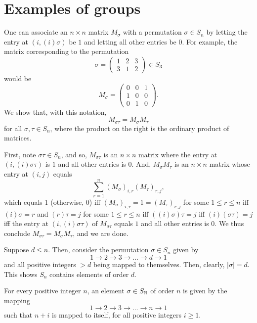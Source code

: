 \section{Examples of groups}
\begin{xca}
One can associate an $n \times n$ matrix $M_{\sigma}$ with a permutation
$\sigma \in S_n$ by letting the entry at $(i, (i)\sigma)$ be $1$ and letting
all other entries be 0. For example, the matrix corresponding to the
permutation
\[
\sigma =
    \begin{pmatrix}
        1 & 2 & 3 \\
        3 & 1 & 2
    \end{pmatrix}
        \in S_3
\]
would be
\[
M_{\sigma} =
    \begin{pmatrix}
        0 & 0 & 1 \\
        1 & 0 & 0 \\
        0 & 1 & 0
    \end{pmatrix}.
\]
We show that, with this notation, \[ M_{\sigma \tau} = M_{\sigma} M_{\tau} \]
for all $\sigma, \tau \in S_n$, where the product on the right is the ordinary
product of matrices.

First, note $\sigma \tau \in S_n$, and so, $M_{\sigma \tau}$ is an $n \times n$
matrix where the entry at $(i, (i)\sigma \tau)$ is $1$ and all other entries is
$0$. And, $M_{\sigma} M_{\tau}$ is an $n \times n$ matrix whose entry at
$(i, j)$ equals \[ \sum_{r=1}^{n} (M_{\sigma})_{i,r} (M_{\tau})_{r,j}, \] which
equals $1$ (otherwise, $0$) iff $(M_{\sigma})_{i,r} = 1 = (M_{\tau})_{r,j}$ for
some $1 \le r \le n$ iff $(i)\sigma = r$ and $(r)\tau = j$ for some $1 \le r \le
n$ iff $((i)\sigma) \tau = j$ iff $(i)(\sigma \tau) = j$ iff the entry at
$(i, (i)\sigma \tau)$ of $M_{\sigma \tau}$ equals $1$ and all other entries is
$0$. We thus conclude $M_{\sigma \tau} = M_{\sigma} M_{\tau}$, and we are done.
\end{xca}

\begin{xca}
Suppose $d \le n$. Then, consider the permutation $\sigma \in S_n$ given by
\[ 1 \to 2 \to 3 \to \ldots \to d \to 1 \] and all positive integers $> d$
being mapped to themselves. Then, clearly, $|\sigma| = d$. This shows $S_n$
contains elements of order $d$.
\end{xca}

\begin{xca}
For every positive integer $n$, an element $\sigma \in S_{\mathbb{N}}$ of order $n$ is
given by the mapping \[ 1 \to 2 \to 3 \to \ldots \to n \to 1 \] such that
$n+i$ is mapped to itself, for all positive integers $i \ge 1$.
\end{xca}

\begin{xca}
\end{xca}

\begin{xca}
\end{xca}

\begin{xca}
\end{xca}

\begin{xca}
\end{xca}

\begin{xca}
\end{xca}
